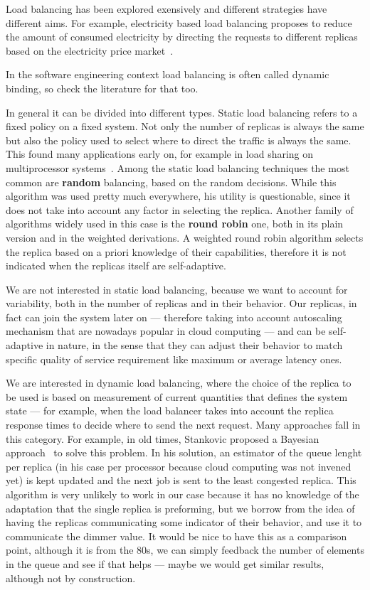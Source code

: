 Load balancing has been explored exensively and different strategies
have different aims. For example, electricity based load balancing
proposes to reduce the amount of consumed electricity by directing the
requests to different replicas based on the electricity price
market~\cite{LoadBalancingForElectricity:TCC}.

In the software engineering context load balancing is often called
dynamic binding, so check the literature for that too.

In general it can be divided into different types. Static load
balancing refers to a fixed policy on a fixed system. Not only the
number of replicas is always the same but also the policy used to
select where to direct the traffic is always the same. This found many
applications early on, for example in load sharing on multiprocessor
systems~\cite{StaticLoadBalancing:TSE,StaticOptimal:ACM}. Among the
static load balancing techniques the most common are \textbf{random}
balancing, based on the random decisions. While this algorithm was
used pretty much everywhere, his utility is questionable, since it
does not take into account any factor in selecting the
replica. Another family of algorithms widely used in this case is the
\textbf{round robin} one, both in its plain version and in the
weighted derivations. A weighted round robin algorithm selects the
replica based on a priori knowledge of their capabilities, therefore
it is not indicated when the replicas itself are self-adaptive.
 
We are not interested in static load balancing, because we want to
account for variability, both in the number of replicas and in their
behavior. Our replicas, in fact can join the system later on ---
therefore taking into account autoscaling mechanism that are nowadays
popular in cloud computing --- and can be self-adaptive in nature, in
the sense that they can adjust their behavior to match specific
quality of service requirement like maximum or average latency
ones. 

We are interested in dynamic load balancing, where the choice of the
replica to be used is based on measurement of current quantities that
defines the system state --- for example, when the load balancer takes
into account the replica response times to decide where to send the
next request. Many approaches fall in this category. For example, in
old times, Stankovic proposed a Bayesian approach~\cite{Stankovic:TC}
to solve this problem. In his solution, an estimator of the queue
lenght per replica (in his case per processor because cloud computing
was not invened yet) is kept updated and the next job is sent to the
least congested replica. This algorithm is very unlikely to work in
our case because it has no knowledge of the adaptation that the single
replica is preforming, but we borrow from the idea of having the
replicas communicating some indicator of their behavior, and use it to
communicate the dimmer value. It would be nice to have this as a
comparison point, although it is from the 80s, we can simply feedback
the number of elements in the queue and see if that helps --- maybe we
would get similar results, although not by construction.

